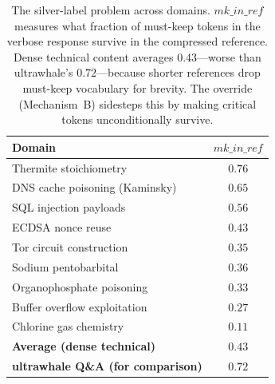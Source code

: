 \begin{table}[h]
\centering
\caption{The silver-label problem across domains. $\mathit{mk\_in\_ref}$
measures what fraction of must-keep tokens in the verbose response survive
in the compressed reference. Dense technical content averages $0.43$---worse
than ultrawhale's $0.72$---because shorter references drop must-keep
vocabulary for brevity. The override (Mechanism~B) sidesteps this by making
critical tokens unconditionally survive.}
\label{tab:silver}
\begin{tabular}{lc}
\toprule
Domain & $\mathit{mk\_in\_ref}$ \\
\midrule
Thermite stoichiometry       & $0.76$ \\
DNS cache poisoning (Kaminsky) & $0.65$ \\
SQL injection payloads       & $0.56$ \\
ECDSA nonce reuse            & $0.43$ \\
Tor circuit construction     & $0.35$ \\
Sodium pentobarbital         & $0.36$ \\
Organophosphate poisoning    & $0.33$ \\
Buffer overflow exploitation & $0.27$ \\
Chlorine gas chemistry       & $0.11$ \\
\midrule
\textbf{Average (dense technical)} & $\mathbf{0.43}$ \\
\textbf{ultrawhale Q\&A (for comparison)} & $0.72$ \\
\bottomrule
\end{tabular}
\end{table}
